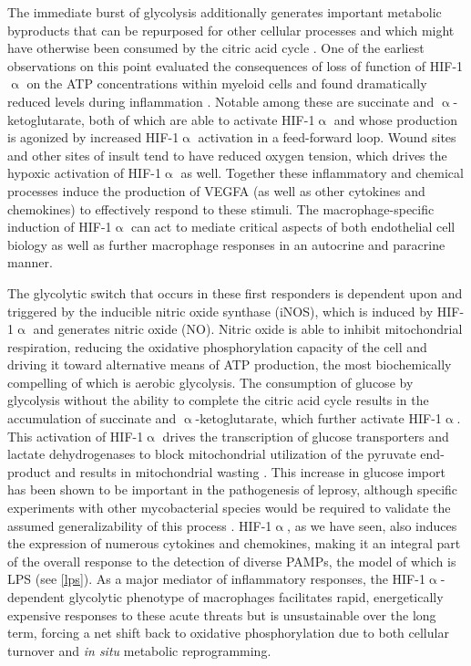 The immediate burst of glycolysis additionally generates important metabolic byproducts that can be repurposed for other cellular processes and which might have otherwise been consumed by the citric acid cycle \citep{Viola2019, Kelly2015}. One of the earliest observations on this point evaluated the consequences of loss of function of HIF\hyp{}1$\upalpha$ on the ATP concentrations within myeloid cells and found dramatically reduced levels during inflammation \citep{Cramer2003}. Notable among these are succinate and $\upalpha$\hyp{}ketoglutarate, both of which are able to activate HIF\hyp{}1$\upalpha$ and whose production is agonized by increased HIF\hyp{}1$\upalpha$ activation in a feed\hyp{}forward loop. Wound sites and other sites of insult tend to have reduced oxygen tension, which drives the hypoxic activation of HIF\hyp{}1$\upalpha$ as well. Together these inflammatory and chemical processes induce the production of VEGFA (as well as other cytokines and chemokines) to effectively respond to these stimuli. The macrophage\hyp{}specific induction of HIF\hyp{}1$\upalpha$ can act to mediate critical aspects of both endothelial cell biology as well as further macrophage responses in an autocrine and paracrine manner.

The glycolytic switch that occurs in these first responders is dependent upon and triggered by the inducible nitric oxide synthase (iNOS), which is induced by HIF\hyp{}1$\upalpha$ and generates nitric oxide (NO). Nitric oxide is able to inhibit mitochondrial respiration, reducing the oxidative phosphorylation capacity of the cell and driving it toward alternative means of ATP production, the most biochemically compelling of which is aerobic glycolysis. The consumption of glucose by glycolysis without the ability to complete the citric acid cycle results in the accumulation of succinate and $\upalpha$\hyp{}ketoglutarate, which further activate HIF\hyp{}1$\upalpha$. This activation of HIF\hyp{}1$\upalpha$ drives the transcription of glucose transporters and lactate dehydrogenases to block mitochondrial utilization of the pyruvate end\hyp{}product and results in mitochondrial wasting \citep{Russell2019a, GalvanPena2014}. This increase in glucose import has been shown to be important in the pathogenesis of leprosy, although specific experiments with other mycobacterial species would be required to validate the assumed generalizability of this process \citep{Medeiros2016, MontoyaRosales2016, Vance2019}. HIF\hyp{}1$\upalpha$, as we have seen, also induces the expression of numerous cytokines and chemokines, making it an integral part of the overall response to the detection of diverse PAMPs, the model of which is LPS (see \autoref{lps}). As a major mediator of inflammatory responses, the HIF\hyp{}1$\upalpha$\hyp{}dependent glycolytic phenotype of macrophages facilitates rapid, energetically expensive responses to these acute threats but is unsustainable over the long term, forcing a net shift back to oxidative phosphorylation due to both cellular turnover and \textit{in situ} metabolic reprogramming.

